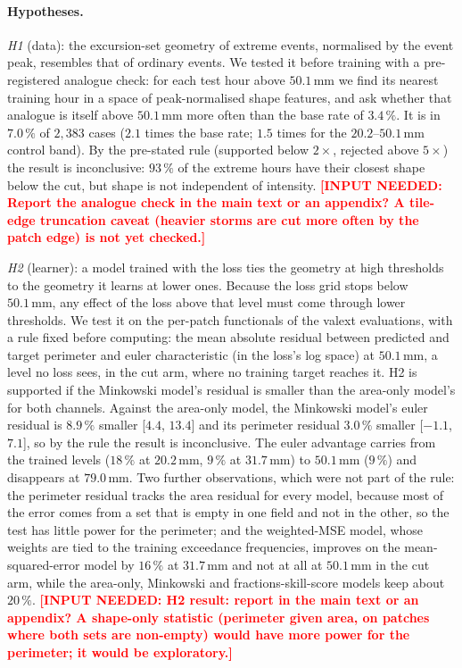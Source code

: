 \documentclass{article}
\newcommand{\needinput}[1]{\textcolor{red}{\textbf{[INPUT NEEDED: #1]}}}
\begin{document}
\paragraph{Hypotheses.} \emph{H1} (data): the excursion-set geometry of extreme events, normalised by the event
peak, resembles that of ordinary events. We tested it before training with a pre-registered analogue check: for each
test hour above $50.1\,\mathrm{mm}$ we find its nearest training hour in a space of peak-normalised shape features,
and ask whether that analogue is itself above $50.1\,\mathrm{mm}$ more often than the base rate of $3.4\,\%$. It is in
$7.0\,\%$ of $2{,}383$ cases ($2.1$ times the base rate; $1.5$ times for the $20.2$--$50.1\,\mathrm{mm}$ control band).
By the pre-stated rule (supported below $2\times$, rejected above $5\times$) the result is inconclusive: $93\,\%$ of
the extreme hours have their closest shape below the cut, but shape is not independent of intensity.
\needinput{Report the analogue check in the main text or an appendix? A tile-edge truncation caveat (heavier storms
are cut more often by the patch edge) is not yet checked.}

\emph{H2} (learner): a model trained with the loss ties the geometry at high thresholds to the geometry it learns at
lower ones. Because the loss grid stops below $50.1\,\mathrm{mm}$, any effect of the loss above that level must come
through lower thresholds. We test it on the per-patch functionals of the valext evaluations, with a rule fixed before
computing: the mean absolute residual between predicted and target perimeter and euler characteristic (in the loss's
log space) at $50.1\,\mathrm{mm}$, a level no loss sees, in the cut arm, where no training target reaches it. H2 is
supported if the Minkowski model's residual is smaller than the area-only model's for both channels. Against the
area-only model, the Minkowski model's euler residual is $8.9\,\%$ smaller [$4.4$, $13.4$] and its perimeter residual
$3.0\,\%$ smaller [$-1.1$, $7.1$], so by the rule the result is inconclusive. The euler advantage carries from the
trained levels ($18\,\%$ at $20.2\,\mathrm{mm}$, $9\,\%$ at $31.7\,\mathrm{mm}$) to $50.1\,\mathrm{mm}$ ($9\,\%$) and
disappears at $79.0\,\mathrm{mm}$. Two further observations, which were not part of the rule: the perimeter residual
tracks the area residual for every model, because most of the error comes from a set that is empty in one field and
not in the other, so the test has little power for the perimeter; and the weighted-MSE model, whose weights are tied
to the training exceedance frequencies, improves on the mean-squared-error model by $16\,\%$ at $31.7\,\mathrm{mm}$ and
not at all at $50.1\,\mathrm{mm}$ in the cut arm, while the area-only, Minkowski and fractions-skill-score models keep
about $20\,\%$. \needinput{H2 result: report in the main text or an appendix? A shape-only statistic (perimeter given
area, on patches where both sets are non-empty) would have more power for the perimeter; it would be exploratory.}
\end{document}
